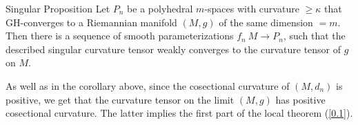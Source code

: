 \documentclass{article}
\begin{document}
\begin{thm}{Singular Proposition} Let $P_n$ be a polyhedral $m$-spaces
with curvature $\ge \kappa$ that GH-converges to a Riemannian
manifold $(M,g)$ of the same dimension $=m$. Then there is a
sequence of smooth parameterizations $f_n\:M\to P_n$, such that the
described singular curvature tensor  weakly converges to the
curvature tensor of $g$ on $M$.
\end{thm}


As well as in the corollary above, since the cosectional curvature of $(M,d_n)$ is positive, we get that the curvature tensor on the limit $(M,g)$ has positive cosectional curvature.
The latter implies the first part of the local theorem (\ref{0.1}).


   
\sloppy
\def\emph{\textit}
\printbibliography[heading=bibintoc]
\fussy
\end{document}
